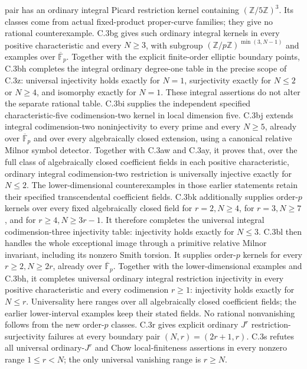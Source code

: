 pair has an ordinary integral Picard restriction kernel containing
$(\mathbb Z/5\mathbb Z)^3$. Its classes come from actual fixed-product
proper-curve families; they give no rational counterexample.
C.3bg gives such ordinary integral kernels in every positive
characteristic and every $N\ge3$, with subgroup
$(\mathbb Z/p\mathbb Z)^{\min(3,N-1)}$ and examples over
$\overline{\mathbb F}_p$. Together with the explicit finite-order
elliptic boundary points, C.3bh completes the integral ordinary
degree-one table in the precise scope of C.3z: universal
injectivity holds exactly for $N=1$, surjectivity exactly for
$N\le2$ or $N\ge4$, and isomorphy exactly for $N=1$.
These integral assertions do not alter the separate rational table.
C.3bi supplies the independent specified characteristic-five
codimension-two kernel in local dimension five. C.3bj extends
integral codimension-two noninjectivity to every prime and every
$N\ge5$, already over $\overline{\mathbb F}_p$ and over every
algebraically closed extension, using a canonical relative Milnor
symbol detector. Together with C.3aw and C.3ay, it proves that,
over the full class of algebraically closed coefficient fields in each
positive characteristic, ordinary integral codimension-two restriction
is universally injective exactly for $N\le2$. The lower-dimensional
counterexamples in those earlier statements retain their specified
transcendental coefficient fields. C.3bk additionally supplies
order-$p$ kernels over every fixed algebraically closed field for
$r=2,N\ge4$, for $r=3,N\ge7$, and for $r\ge4,N\ge3r-1$.
It therefore completes the universal integral codimension-three
injectivity table: injectivity holds exactly for $N\le3$.
C.3bl then handles the whole exceptional image through a primitive
relative Milnor invariant, including its nonzero Smith torsion.
It supplies order-$p$ kernels for every $r\ge2,N\ge2r$, already
over $\overline{\mathbb F}_p$. Together with the lower-dimensional
examples and C.3bh, it completes universal ordinary integral
restriction injectivity in every positive characteristic and every
codimension $r\ge1$: injectivity holds exactly for $N\le r$.
Universality here ranges over all algebraically closed coefficient
fields; the earlier lower-interval examples keep their stated fields.
No rational nonvanishing follows from the new order-$p$ classes.
C.3r gives explicit ordinary $J^r$ restriction-surjectivity
failures at every boundary pair $(N,r)=(2r+1,r)$. C.3s
refutes all universal ordinary-$J^r$ and Chow local-finiteness
assertions in every nonzero range $1\le r<N$; the only
universal vanishing range is $r\ge N$.
